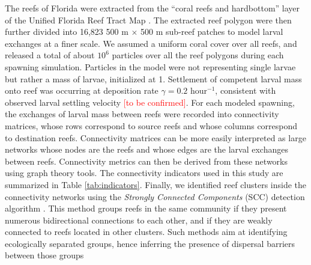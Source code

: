 \documentclass[preprint,12pt,authoryear]{elsarticle}
\begin{document}
The reefs of Florida were extracted from the “coral reefs and hardbottom” layer of the Unified Florida Reef Tract Map \citep{fwc2017unified}. The extracted reef polygon were then further divided into 16,823 500 m $\times$ 500 m sub-reef patches to model larval exchanges at a finer scale. We assumed a uniform coral cover over all reefs, and released a total of about $10^6$ particles over all the reef polygons during each spawning simulation. Particles in the model were not representing single larvae but rather a mass of larvae, initialized at 1. Settlement of competent larval mass onto reef was occurring at deposition rate $\gamma = 0.2$ hour$^{-1}$, consistent with observed larval settling velocity \textcolor{red}{[to be confirmed]}. For each modeled spawning, the exchanges of larval mass between reefs were recorded into connectivity matrices, whose rows correspond to source reefs and whose columns correspond to destination reefs. Connectivity matrices can be more easily interpreted as large networks whose nodes are the reefs and whose edges are the larval exchanges between reefs. Connectivity metrics can then be derived from these networks using graph theory tools. The connectivity indicators used in this study are summarized in Table \ref{tab:indicators}. Finally, we identified reef clusters inside the connectivity networks using the \textit{Strongly Connected Components} (SCC) detection algorithm \citep{nuutila1994finding}. This method groups reefs in the same community if they present numerous bidirectional connections to each other, and if they are weakly connected to reefs located in other clusters. Such methods aim at identifying ecologically separated groups, hence inferring the presence of dispersal barriers between those groups \citep{thomas2014numerical,saint2023biophysical}
\end{document}
